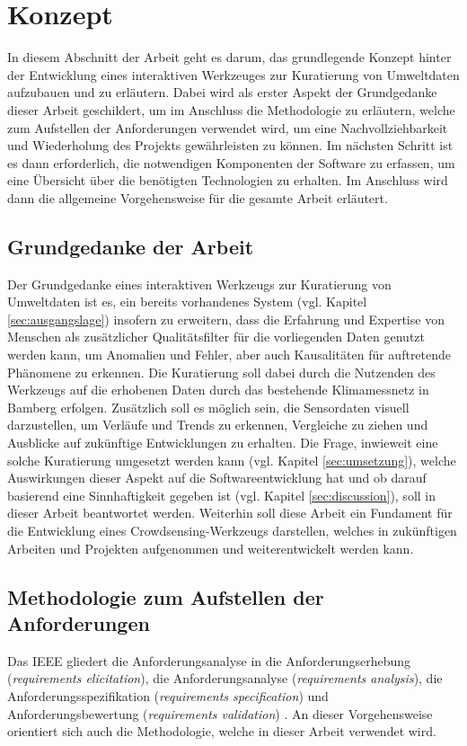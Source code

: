 \chapter{Konzept} %
In diesem Abschnitt der Arbeit geht es darum, das grundlegende Konzept hinter der Entwicklung eines interaktiven Werkzeuges zur Kuratierung von Umweltdaten aufzubauen und zu erläutern. Dabei wird als erster Aspekt der Grundgedanke dieser Arbeit geschildert, um im Anschluss die Methodologie zu erläutern, welche zum Aufstellen der Anforderungen verwendet wird,
um eine Nachvollziehbarkeit und Wiederholung des Projekts gewährleisten zu können. \newline Im nächsten Schritt ist es dann erforderlich, die notwendigen Komponenten der Software zu erfassen, um eine Übersicht über die benötigten Technologien zu erhalten. Im Anschluss wird dann die allgemeine Vorgehensweise für die gesamte Arbeit erläutert.

\section{Grundgedanke der Arbeit}
Der Grundgedanke eines interaktiven Werkzeugs zur Kuratierung von Umweltdaten ist es, ein bereits vorhandenes System (vgl. Kapitel \ref{sec:ausgangslage}) insofern zu erweitern, dass die Erfahrung und Expertise von Menschen als zusätzlicher Qualitätsfilter für die vorliegenden Daten genutzt werden kann, um Anomalien und Fehler, aber auch Kausalitäten für auftretende Phänomene zu erkennen. Die Kuratierung soll dabei durch die Nutzenden des Werkzeugs auf die erhobenen Daten durch das bestehende Klimamessnetz in Bamberg erfolgen. Zusätzlich soll es möglich sein, die Sensordaten visuell darzustellen, um Verläufe und Trends zu erkennen, Vergleiche zu ziehen und Ausblicke auf zukünftige Entwicklungen zu erhalten. Die Frage, inwieweit eine solche Kuratierung umgesetzt werden kann (vgl. Kapitel \ref{sec:umsetzung}), welche Auswirkungen dieser Aspekt auf die Softwareentwicklung hat und ob darauf basierend eine Sinnhaftigkeit gegeben ist (vgl. Kapitel \ref{sec:discussion}), soll in dieser Arbeit beantwortet werden. Weiterhin soll diese Arbeit ein Fundament für die Entwicklung eines Crowdsensing-Werkzeugs darstellen, welches in zukünftigen Arbeiten und Projekten aufgenommen und weiterentwickelt werden kann. 

\section{Methodologie zum Aufstellen der Anforderungen}
Das \ac{IEEE} gliedert die Anforderungsanalyse in die Anforderungserhebung (\textit{requirements elicitation}), die Anforderungsanalyse (\textit{requirements analysis}), die Anforderungsspezifikation (\textit{requirements specification}) und Anforderungsbewertung (\textit{requirements validation}) \cite{ieee2004}. An dieser Vorgehensweise orientiert sich auch die Methodologie, welche in dieser Arbeit verwendet wird.

